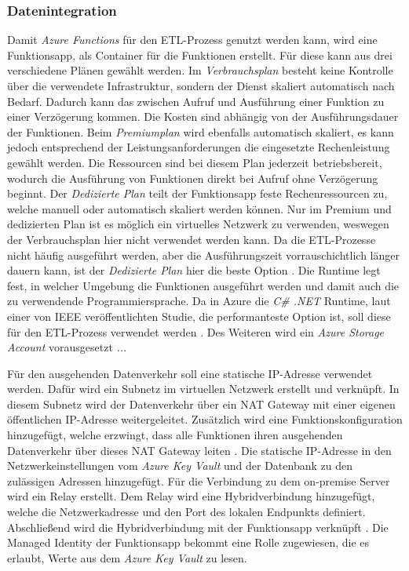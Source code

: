 \subsubsection{Datenintegration} \label{subsec:infra:konfig:functions}
Damit \textit{Azure Functions} für den ETL-Prozess genutzt werden kann, wird eine Funktionsapp, als Container für die Funktionen erstellt. Für diese kann aus drei verschiedene Plänen gewählt werden. Im \textit{Verbrauchsplan} besteht keine Kontrolle über die verwendete Infrastruktur, sondern der Dienst skaliert automatisch nach Bedarf. Dadurch kann das zwischen Aufruf und Ausführung einer Funktion zu einer Verzögerung kommen. Die Kosten sind abhängig von der Ausführungsdauer der Funktionen. Beim \textit{Premiumplan} wird ebenfalls automatisch skaliert, es kann jedoch entsprechend der Leistungsanforderungen die eingesetzte Rechenleistung gewählt werden. Die Ressourcen sind bei diesem Plan jederzeit betriebsbereit, wodurch die Ausführung von Funktionen direkt bei Aufruf ohne Verzögerung beginnt. Der \textit{Dedizierte Plan} teilt der Funktionsapp feste Rechenressourcen zu, welche manuell oder automatisch skaliert werden können. Nur im Premium und dedizierten Plan ist es möglich ein virtuelles Netzwerk zu verwenden, weswegen der Verbrauchsplan hier nicht verwendet werden kann. Da die ETL-Prozesse nicht häufig ausgeführt werden, aber die Ausführungszeit vorrauschichtlich länger dauern kann, ist der \textit{Dedizierte Plan} hier die beste Option \cite[vgl.][]{satapathi_hands-azure_2021}. Die Runtime legt fest, in welcher Umgebung die Funktionen ausgeführt werden und damit auch die zu verwendende Programmiersprache. Da in Azure die \textit{C\# .NET} Runtime, laut einer von IEEE veröffentlichten Studie, die performanteste Option ist, soll diese für den ETL-Prozess verwendet werden \cite[vgl.][]{jackson_investigation_2018}. Des Weiteren wird ein \textit{Azure Storage Account} vorausgesetzt \textit{...}

Für den ausgehenden Datenverkehr soll eine statische IP-Adresse verwendet werden. Dafür wird ein Subnetz im virtuellen Netzwerk erstellt und verknüpft. In diesem Subnetz wird der Datenverkehr über ein NAT Gateway mit einer eigenen öffentlichen IP-Adresse weitergeleitet. Zusätzlich wird eine Funktionskonfiguration hinzugefügt, welche erzwingt, dass alle Funktionen ihren ausgehenden Datenverkehr über dieses NAT Gateway leiten \cite[vgl.][]{msdoc_22_func_ip}. Die statische IP-Adresse in den Netzwerkeinstellungen vom \textit{Azure Key Vault} und der Datenbank zu den zulässigen Adressen hinzugefügt. Für die Verbindung zu dem on-premise Server wird ein Relay erstellt. Dem Relay wird eine Hybridverbindung hinzugefügt, welche die Netzwerkadresse und den Port des lokalen Endpunkts definiert. Abschließend wird die Hybridverbindung mit der Funktionsapp verknüpft \cite[vgl.][]{msdoc_22_func_hybridConn}. Die Managed Identity der Funktionsapp bekommt eine Rolle zugewiesen, die es erlaubt, Werte aus dem \textit{Azure Key Vault} zu lesen.

